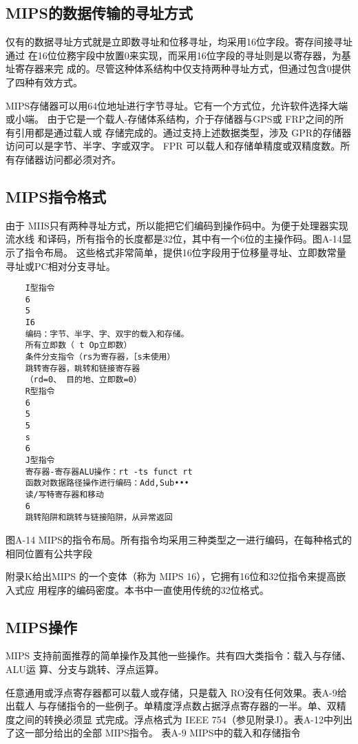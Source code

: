 \subsection{MIPS的数据传输的寻址方式}

仅有的数据寻址方式就是立即数寻址和位移寻址，均采用16位字段。寄存间接寻址通过
在16位位務宇段中放置0来实现，而采用16位字段的寻址则是以寄存器，为基址寄存器来完
成的。尽管这种体系结构中仅支持两种寻址方式，但通过包含0提供了四种有效方式。

MIPS存储器可以用64位地址进行字节寻址。它有一个方式位，允许软件选择大端或小端。
由于它是一个载人-存储体系结构，介于存储器与GPS或 FRP之间的所有引用都是通过载人或
存储完成的。通过支持上述数据类型，涉及 GPR的存储器访问可以是字节、半字、字或双字。
FPR 可以载人和存储单精度或双精度数。所有存储器访问都必须对齐。

\subsection{MIPS指令格式}
由于 MIIS只有两种寻址方式，所以能把它们编码到操作码中。为便于处理器实现流水线
和译码，所有指令的长度都是32位，其中有一个6位的主操作码。图A-14显示了指令布局。
这些格式非常简单，提供16位字段用于位移量寻址、立即数常量寻址或PC相对分支寻址。
\begin{verbatim}
    I型指令
    6
    5
    I6
    编码：字节、半字、字、双宇的载入和存储。
    所有立即数（ t Op立即数）
    条件分支指令（rs为寄存器，［s未使用）
    跳转寄存器，眺转和链接寄存器
    （rd=0、 目的地、立即数=0）
    R型指令
    6
    5
    5
    s
    6
    J型指令
    寄存器-寄存器ALU操作：rt -ts funct rt
    函数对数据路径操作进行编码：Add,Sub•••
    读/写特寄存器和移动
    6
    跳转陷阱和跳转与链接陷阱，从异常返回
\end{verbatim}
图A-14 MIPS的指令布局。所有指令均采用三种类型之一进行编码，在每种格式的相同位置有公共字段

附录K给出MIPS 的一个变体（称为 MIPS 16），它拥有16位和32位指令来提高嵌入式应
用程序的编码密度。本书中一直使用传统的32位格式。

\subsection{MIPS操作}
MIPS 支持前面推荐的简单操作及其他一些操作。共有四大类指令：载入与存储、ALU运
算、分支与跳转、浮点运算。

任意通用或浮点寄存器都可以载人或存储，只是载入 RO没有任何效果。表A-9给出载人
与存储指令的一些例子。单精度浮点数占据浮点寄存器的一半。单、双精度之间的转换必须显
式完成。浮点格式为 IEEE 754（参见附录J）。表A-12中列出了这一部分给出的全部 MIPS指令。
表A-9 MIPS中的载入和存储指令

